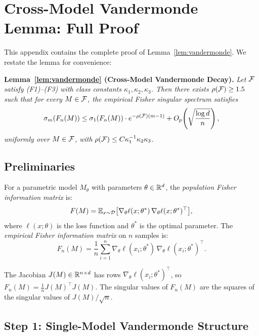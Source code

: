 
\section{Cross-Model Vandermonde Lemma: Full Proof}\label{app:vandermonde}

This appendix contains the complete proof of Lemma~\ref{lem:vandermonde}. We restate the lemma for convenience:

\textbf{Lemma~\ref{lem:vandermonde} (Cross-Model Vandermonde Decay).} \textit{Let $\mathcal{F}$ satisfy (F1)--(F3) with class constants $\kappa_1, \kappa_2, \kappa_3$. Then there exists $\rho(\mathcal{F}) \geq 1.5$ such that for every $M \in \mathcal{F}$, the empirical Fisher singular spectrum satisfies}
\begin{equation*}
    \sigma_m(F_n(M)) \leq \sigma_1(F_n(M)) \cdot e^{-\rho(\mathcal{F})(m-1)} + O_p\!\left(\sqrt{\frac{\log d}{n}}\right),
\end{equation*}
\textit{uniformly over $M \in \mathcal{F}$, with} $\rho(\mathcal{F}) \leq C \kappa_1^{-1} \kappa_2 \kappa_3$.

\subsection{Preliminaries}

For a parametric model $M_\theta$ with parameters $\theta \in \mathbb{R}^d$, the \emph{population Fisher information matrix} is:
\begin{equation}\label{eq:pop-fisher}
    F(M) = \mathbb{E}_{x \sim \mathcal{D}}\bigl[\nabla_\theta \ell(x; \theta^*) \, \nabla_\theta \ell(x; \theta^*)^\top\bigr],
\end{equation}
where $\ell(x; \theta)$ is the loss function and $\theta^*$ is the optimal parameter. The \emph{empirical Fisher information matrix} on $n$ samples is:
\begin{equation}\label{eq:emp-fisher}
    F_n(M) = \frac{1}{n} \sum_{i=1}^n \nabla_\theta \ell(x_i; \theta^*) \, \nabla_\theta \ell(x_i; \theta^*)^\top.
\end{equation}

The Jacobian $J(M) \in \mathbb{R}^{n \times d}$ has rows $\nabla_\theta \ell(x_i; \theta^*)^\top$, so $F_n(M) = \frac{1}{n} J(M)^\top J(M)$. The singular values of $F_n(M)$ are the squares of the singular values of $J(M)/\sqrt{n}$.

\subsection{Step 1: Single-Model Vandermonde Structure}

